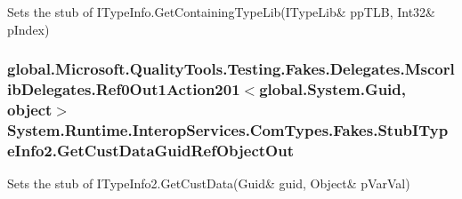 Sets the stub of I\-Type\-Info.\-Get\-Containing\-Type\-Lib(I\-Type\-Lib\& pp\-T\-L\-B, Int32\& p\-Index)

\hypertarget{class_system_1_1_runtime_1_1_interop_services_1_1_com_types_1_1_fakes_1_1_stub_i_type_info2_a4e45872ff4ccf4bf1ef8fc2cca2e2864}{
\subsubsection[{Get\-Cust\-Data\-Guid\-Ref\-Object\-Out}]{\setlength{\rightskip}{0pt plus 5cm}global.\-Microsoft.\-Quality\-Tools.\-Testing.\-Fakes.\-Delegates.\-Mscorlib\-Delegates.\-Ref0\-Out1\-Action201$<$global.\-System.\-Guid, object$>$ System.\-Runtime.\-Interop\-Services.\-Com\-Types.\-Fakes.\-Stub\-I\-Type\-Info2.\-Get\-Cust\-Data\-Guid\-Ref\-Object\-Out}}\label{class_system_1_1_runtime_1_1_interop_services_1_1_com_types_1_1_fakes_1_1_stub_i_type_info2_a4e45872ff4ccf4bf1ef8fc2cca2e2864}


Sets the stub of I\-Type\-Info2.\-Get\-Cust\-Data(Guid\& guid, Object\& p\-Var\-Val)

